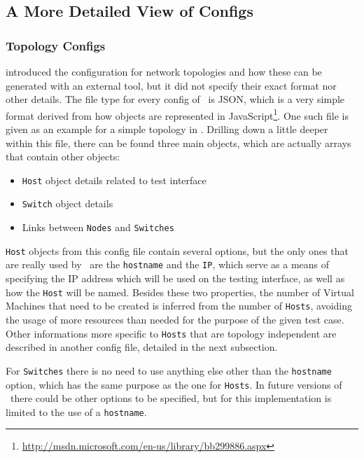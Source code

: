 \subsection{A More Detailed View of Configs}
\label{sub-sec:configs-detalied}

\subsubsection{Topology Configs}
\label{sub-sub-sec:topology-configs}

 introduced the configuration for network topologies and how these can be generated with an external tool, but it did not specify their exact format nor other details.
The file type for every config of \project\ is JSON, which is a very simple format derived from how objects are represented in JavaScript\footnote{\url{http://msdn.microsoft.com/en-us/library/bb299886.aspx}}.
One such file is given as an example for a simple topology in .
Drilling down a little deeper within this file, there can be found three main objects, which are actually arrays that contain other objects:

\begin{itemize}
  \item \texttt{Host} object details related to test interface
  \item \texttt{Switch} object details
  \item Links between \texttt{Nodes} and \texttt{Switches}
\end{itemize}

\texttt{Host} objects from this config file contain several options, but the only ones that are really used by \project\ are the \texttt{hostname} and the \texttt{IP}, which serve as a means of specifying the IP address which will be used on the testing interface, as well as how the \texttt{Host} will be named.
Besides these two properties, the number of Virtual Machines that need to be created is inferred from the number of \texttt{Hosts}, avoiding the usage of more resources than needed for the purpose of the given test case.
Other informations more specific to \texttt{Hosts} that are topology independent are described in another config file, detailed in the next subsection.

For \texttt{Switches} there is no need to use anything else other than the \texttt{hostname} option, which has the same purpose as the one for \texttt{Hosts}.
In future versions of \project\ there could be other options to be specified, but for this implementation is limited to the use of a \texttt{hostname}.

